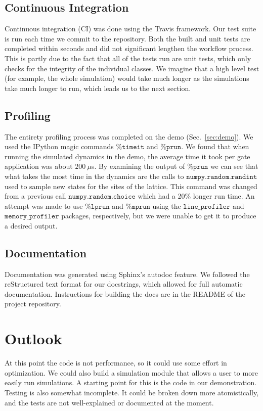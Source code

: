 \documentclass{article}
\begin{document}
\subsection{Continuous Integration}
\label{sec:ci}
Continuous integration (CI) was done using the Travis framework. Our test suite is run each time we commit to the repository.  Both the built and unit tests are completed within seconds and did not significant lengthen the workflow process.  This is partly due to the fact that all of the tests run are unit tests, which only checks for the integrity of the individual classes.  We imagine that a high level test (for example, the whole simulation) would take much longer as the simulations take much longer to run, which leads us to the next section.

\subsection{Profiling}
The entirety profiling process was completed on the demo (Sec.~\ref{sec:demo}). We used the IPython magic commands $\texttt{\%timeit}$ and $\texttt{\%prun}$. We found that when running the simulated dynamics in the demo, the average time it took per gate application was about $200\ \mu$s. By examining the output of $\texttt{\%prun}$ we can see that what takes the most time in the dynamics are the calls to $\texttt{numpy.random.randint}$ used to sample new states for the sites of the lattice.  This command was changed from a previous call $\texttt{numpy.random.choice}$ which had a 20\% longer run time.  An attempt was made to use $\texttt{\%lprun}$ and $\texttt{\%mprun}$ using the $\texttt{line\_profiler}$ and $\texttt{memory\_profiler}$ packages, respectively, but we were unable to get it to produce a desired output.

\subsection{Documentation}
Documentation was generated using Sphinx's autodoc feature. We followed the reStructured text format for our docstrings, which allowed for full automatic documentation. Instructions for building the docs are in the README of the project repository.

\section{Outlook}
At this point the code is not performance, so it could use some effort in optimization. We could also build a simulation module that allows a user to more easily run simulations. A starting point for this is the code in our demonstration. Testing is also somewhat incomplete. It could be broken down more atomistically, and the tests are not well-explained or documented at the moment.
\end{document}
